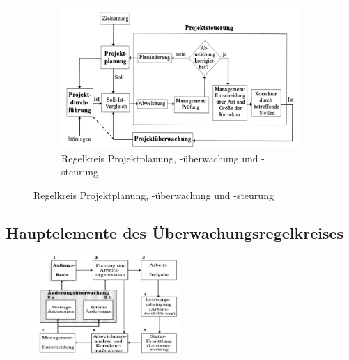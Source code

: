 \documentclass[11pt,a4paper]{article}
\begin{document}
\begin{figure}[H]
\begin{subfigure}{0.45\textwidth}
	\end{subfigure}
	~
	\begin{subfigure}{0.45\textwidth}
		\caption*{Regelkreis Projektplanung, -überwachung und -steurung}
		\includegraphics[width=\textwidth]{ch11/regelkreis}
	\end{subfigure}
\end{figure}

\subsection{Hauptelemente des Überwachungsregelkreises}

\begin{figure}[H]
	\centering
	\includegraphics[width=0.5\textwidth]{ch11/hauptelemente}
\end{figure}
\end{document}
